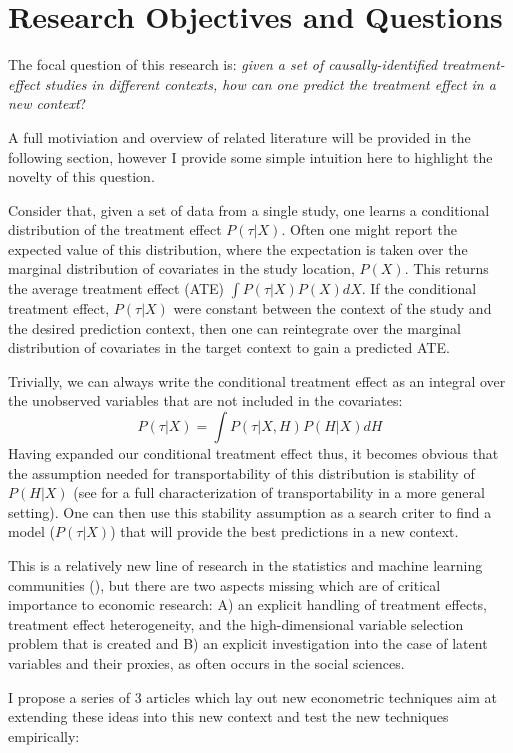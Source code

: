 \documentclass[a4paper,12pt]{article}
\begin{document}
\section{Research Objectives and Questions}

The focal question of this research is: \textit{given a set of causally-identified treatment-effect studies in different contexts, how can one predict the treatment effect in a new context}?

A full motiviation and overview of related literature will be provided in the following section, however I provide some simple intuition here to highlight the novelty of this question.

Consider that, given a set of data from a single study, one learns a conditional distribution of the treatment effect $P(\tau | X)$. Often one might report the expected value of this distribution, where the expectation is taken over the marginal distribution of covariates in the study location, $P(X)$. This returns the average treatment effect (ATE) $\int P(\tau | X)P(X) dX$. If the conditional treatment effect, $P(\tau | X)$ were constant between the context of the study and the desired prediction context, then one can reintegrate over the marginal distribution of covariates in the target context to gain a predicted ATE.

Trivially, we can always write the conditional treatment effect as an integral over the unobserved variables that are not included in the covariates:
%
$$
P(\tau | X) = \int P(\tau | X, H) P(H | X) dH
$$
%
Having expanded our conditional treatment effect thus, it becomes obvious that the assumption needed for transportability of this distribution is stability of $P(H | X)$ (see \cite{Pearl2014} for a full characterization of transportability in a more general setting). One can then use this stability assumption as a search criter to find a model ($P(\tau | X)$) that will provide the best predictions in a new context.

This is a relatively new line of research in the statistics and machine learning communities (\cite{Rojas-carulla2018, Heinze-deml2017}), but there are two aspects missing which are of critical importance to economic research: A) an explicit handling of treatment effects, treatment effect heterogeneity, and the high-dimensional variable selection problem that is created and B) an explicit investigation into the case of latent variables and their proxies, as often occurs in the social sciences.

I propose a series of 3 articles which lay out new econometric techniques aim at extending these ideas into this new context and test the new techniques empirically:
\end{document}
